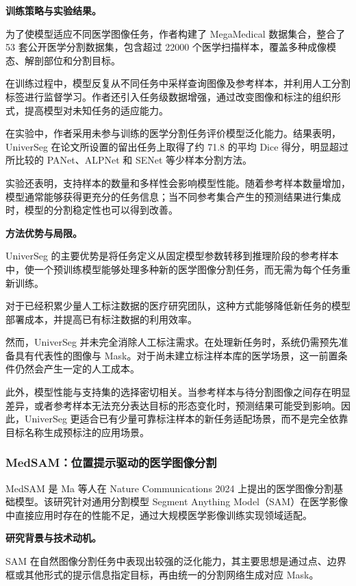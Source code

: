 \documentclass[10.5pt,compsoc]{CjC}
\theoremstyle{mystyle}
\begin{document}
\noindent\textbf{训练策略与实验结果。}

为了使模型适应不同医学图像任务，作者构建了 MegaMedical 数据集合，整合了 53 套公开医学分割数据集，包含超过 22000 个医学扫描样本，覆盖多种成像模态、解剖部位和分割目标。

在训练过程中，模型反复从不同任务中采样查询图像及参考样本，并利用人工分割标签进行监督学习。作者还引入任务级数据增强，通过改变图像和标注的组织形式，提高模型对未知任务的适应能力。

在实验中，作者采用未参与训练的医学分割任务评价模型泛化能力。结果表明，UniverSeg 在论文所设置的留出任务上取得了约 71.8 的平均 Dice 得分，明显超过所比较的 PANet、ALPNet 和 SENet 等少样本分割方法。

实验还表明，支持样本的数量和多样性会影响模型性能。随着参考样本数量增加，模型通常能够获得更充分的任务信息；当不同参考集合产生的预测结果进行集成时，模型的分割稳定性也可以得到改善。

\noindent\textbf{方法优势与局限。}

UniverSeg 的主要优势是将任务定义从固定模型参数转移到推理阶段的参考样本中，使一个预训练模型能够处理多种新的医学图像分割任务，而无需为每个任务重新训练。

对于已经积累少量人工标注数据的医疗研究团队，这种方式能够降低新任务的模型部署成本，并提高已有标注数据的利用效率。

然而，UniverSeg 并未完全消除人工标注需求。在处理新任务时，系统仍需预先准备具有代表性的图像与 Mask。对于尚未建立标注样本库的医学场景，这一前置条件仍然会产生一定的人工成本。

此外，模型性能与支持集的选择密切相关。当参考样本与待分割图像之间存在明显差异，或者参考样本无法充分表达目标的形态变化时，预测结果可能受到影响。因此，UniverSeg 更适合已有少量可靠标注样本的新任务适配场景，而不是完全依靠目标名称生成预标注的应用场景。

\subsubsection{MedSAM：位置提示驱动的医学图像分割}

MedSAM 是 Ma 等人在 Nature Communications 2024 上提出的医学图像分割基础模型\cite{medsam2024}。该研究针对通用分割模型 Segment Anything Model（SAM）在医学影像中直接应用时存在的性能不足，通过大规模医学影像训练实现领域适配。

\noindent\textbf{研究背景与技术动机。}

SAM 在自然图像分割任务中表现出较强的泛化能力，其主要思想是通过点、边界框或其他形式的提示信息指定目标，再由统一的分割网络生成对应 Mask。
\end{document}
